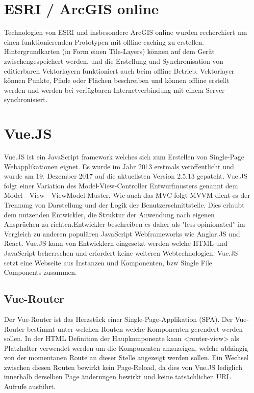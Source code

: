 \section{ESRI / ArcGIS online}
Technologien von ESRI und insbesondere ArcGIS online wurden recherchiert um einen funktionierenden Prototypen mit offline-caching zu erstellen. Hintergrundkarten (in Form einen Tile-Layers) k\"onnen auf dem Ger\"at zwischengespeichert werden, und die Erstellung und Synchronisation von editierbaren Vektorlayern funktioniert auch beim offline Betrieb. Vektorlayer k\"onnen Punkte, Pfade oder Fl\"achen beschreiben und k\"onnen offline erstellt werden und werden bei verf\"ugbaren Internetverbindung mit einem Server synchronisiert.

\section{Vue.JS}
Vue.JS ist ein JavaScript framework welches sich zum Erstellen von Single-Page Webapplikationen eignet. Es wurde im Jahr 2013 erstmals ver\"offentlicht und wurde am 19. Dezember 2017 auf die aktuellsten Version 2.5.13 gepatcht. Vue.JS folgt einer Variation des Model-View-Controller Entwurfmusters genannt dem Model - View - ViewModel Muster. Wie auch das MVC folgt MVVM dient es der Trennung von Darstellung und der Logik der Benutzerschnittstelle. Dies erlaubt dem nutzenden Entwickler, die Struktur der Anwendung nach eigenen Anspr\"uchen zu richten.Entwickler beschreiben es daher als "less opinionated" im Vergleich zu anderen popul\"aren JavaScript Webframeworks wie Anglar.JS und React. Vue.JS kann von Entwicklern eingesetzt werden welche HTML und JavaScript beherrschen und erfordert keine weiteren Webtechnologien. Vue.JS setzt eine Webseite aus Instanzen und Komponenten, bzw Single File Components zusammen.

\subsection{Vue-Router}
Der Vue-Router ist das Herzst\"uck einer Single-Page-Applikation (SPA). Der Vue-Router bestimmt unter welchen Routen welche Komponenten gerendert werden sollen. In der HTML Definition der Haupkomponente kann <router-view> als Platzhalter verwendet werden um die Komponenten anzuzeigen, welche abh\"angig von der momentanen Route an dieser Stelle angezeigt werden sollen. Ein Wechsel zwischen diesen Routen bewirkt kein Page-Reload, da dies von Vue.JS lediglich innerhalb derselben Page \"anderungen bewirkt und keine tats\"achlichen URL Aufrufe ausf\"uhrt.

